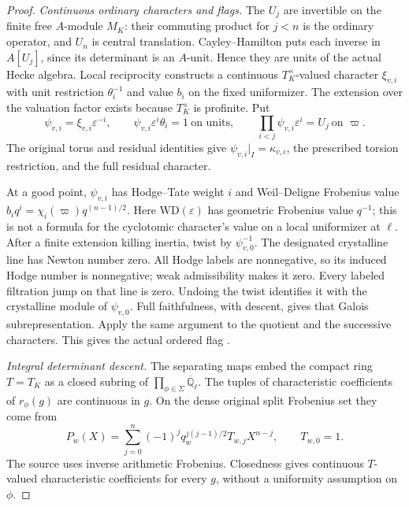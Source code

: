 \begin{proof}
\emph{Continuous ordinary characters and flags.}
The \(U_j\) are invertible on the finite free \(A\)-module \(M_K\):
their commuting product for \(j<n\) is the ordinary operator, and
\(U_n\) is central translation. Cayley--Hamilton puts each inverse
in \(A[U_j]\), since its determinant is an \(A\)-unit. Hence they
are units of the actual Hecke algebra. Local
reciprocity constructs a continuous \(T_K^\times\)-valued
character \(\xi_{v,i}\) with unit restriction \(\theta_i^{-1}\)
and value \(b_i\) on the fixed uniformizer.  The extension over
the valuation factor exists because \(T_K^\times\) is profinite.
Put
\begin{equation}\label{eq:selmer-hecke-determinant-psi}
 \psi_{v,i}=\xi_{v,i}\varepsilon^{-i},\qquad
 \psi_{v,i}\varepsilon^i\theta_i=1\ \text{on units},\qquad
 \prod_{i<j}\psi_{v,i}\varepsilon^i=U_j\ \text{on }\varpi.
\end{equation}
The original torus and residual identities give
\(\psi_{v,i}|_I=\kappa_{v,i}\), the prescribed torsion restriction,
and the full residual character.

At a good point, \(\psi_{v,i}\) has Hodge--Tate weight \(i\) and
Weil--Deligne Frobenius value
\(b_iq^i=\chi_i(\varpi)q^{(n-1)/2}\).
Here \(\mathrm{WD}(\varepsilon)\) has geometric Frobenius
value \(q^{-1}\); this is not a formula for the cyclotomic
character's value on a local uniformizer at \(\ell\).
After a finite extension killing inertia, twist by
\(\psi_{v,0}^{-1}\).  The designated crystalline line has
Newton number zero.  All Hodge labels are nonnegative, so its
induced Hodge number is nonnegative; weak admissibility makes
it zero.  Every labeled filtration jump on that line is zero.
Undoing the twist identifies it with the crystalline module of
\(\psi_{v,0}\).  Full faithfulness, with descent, gives that
Galois subrepresentation.  Apply the same argument to the
quotient and the successive characters.  This gives the actual
ordered flag \cite{SelmerHeckeDetCF}.

\emph{Integral determinant descent.}
The separating maps embed the compact ring \(T=T_K\) as a closed
subring of \(\prod_{\phi\in\Sigma}\overline{\mathbb Q}_\ell\).
The tuples of characteristic coefficients of \(r_\phi(g)\)
are continuous in \(g\).  On the dense original split Frobenius
set they come from
\[
 P_w(X)=\sum_{j=0}^n(-1)^j q_w^{j(j-1)/2}T_{w,j}X^{n-j},
 \qquad T_{w,0}=1.
\]
The source uses inverse arithmetic Frobenius.  Closedness gives
continuous \(T\)-valued characteristic coefficients for every
\(g\), without a uniformity assumption on \(\phi\).


\end{proof}

